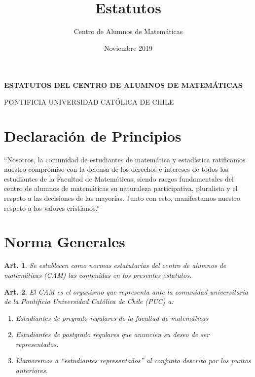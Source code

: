 \documentclass[letterpaper,11pt]{article}
\title{Estatutos}
\author{Centro de Alumnos de Matemáticas}
\date{Noviembre 2019}
\theoremstyle{plain}
\newtheorem{art}{Art.} %
\begin{document}
\thispagestyle{plain}
\vspace*{-75pt}

\begin{center}
	\begin{Large}
		{\bf
			ESTATUTOS DEL CENTRO DE ALUMNOS DE MATEMÁTICAS

			PONTIFICIA UNIVERSIDAD CATÓLICA DE CHILE
		}
	\end{Large}

	\vspace*{30pt}

\end{center}
\tableofcontents
\newpage
{}

\section{Declaración de Principios}\label{principios}
``Nosotros, la comunidad de estudiantes de matemática y estadística ratificamos nuestro compromiso con la defensa de los derechos e intereses de todos los estudiantes de la Facultad de Matemáticas, siendo rasgos fundamentales del centro de alumnos de matemáticas su naturaleza participativa, pluralista y el respeto a las decisiones de las mayorías. Junto con esto, manifestamos nuestro respeto a los valores cristianos.''

\section{Norma Generales}\label{normasGenerales}
\begin{art}\label{}
	Se establecen como normas estatutarias del centro de alumnos de matemáticas (CAM) las contenidas en los presentes estatutos.%
\end{art}

\begin{art}\label{}
	El CAM es el organismo que representa ante la comunidad universitaria de la Pontificia Universidad Católica de Chile (PUC) a:
	\begin{enumerate}
		\item Estudiantes de pregrado regulares de la facultad de matemáticas
		\item Estudiantes de postgrado regulares que anuncien su deseo de ser representados.
		\item Llamaremos a ``estudiantes representados'' al conjunto descrito por los puntos anteriores.
	\end{enumerate}
\end{art}
\end{document}
